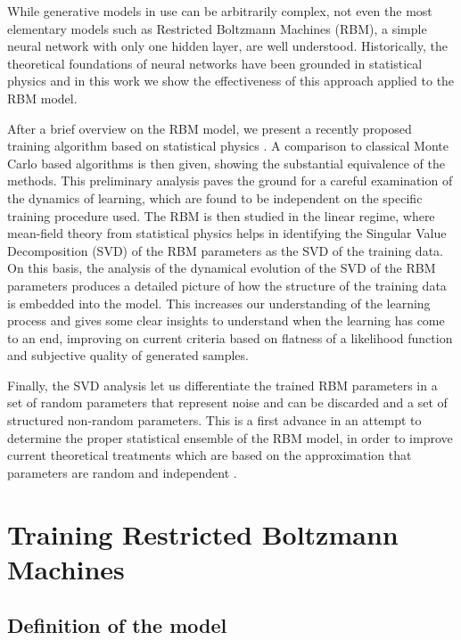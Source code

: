 \documentclass[notitlepage]{revtex4-1}
\begin{document}
While generative models in use can be arbitrarily complex, not even the most elementary models such as Restricted Boltzmann Machines (RBM), a simple neural network with only one hidden layer, are well understood. Historically, the theoretical foundations of neural networks have been grounded in statistical physics \cite{hist1}\cite{hist2} and in this work we show the effectiveness of this approach applied to the RBM model.

After a brief overview on the RBM model, we present a recently proposed training algorithm based on statistical physics \cite{tap_train}\cite{tap}. A comparison to classical Monte Carlo based algorithms is then given, showing the substantial equivalence of the methods. This preliminary analysis paves the ground for a careful examination of the dynamics of learning, which are found to be independent on the specific training procedure used. The RBM is then studied in the linear regime, where mean-field theory from statistical physics helps in identifying the Singular Value Decomposition (SVD) of the RBM parameters as the SVD of the training data.
On this basis, the analysis of the dynamical evolution of the SVD of the RBM parameters produces a detailed picture of how the structure of the training data is embedded into the model. This increases our understanding of the learning process and gives some clear insights to understand when the learning has come to an end, improving on current criteria based on flatness of a likelihood function and subjective quality of generated samples.

Finally, the SVD analysis let us differentiate the trained RBM parameters in a set of random parameters that represent noise and can be discarded and a set of structured non-random parameters. This is a first advance in an attempt to determine the proper statistical ensemble of the RBM model, in order to improve current theoretical treatments which are based on the approximation that parameters are random and independent \cite{monasson}.

\section{Training Restricted Boltzmann Machines} \label{training}

\subsection{Definition of the model}
\end{document}

